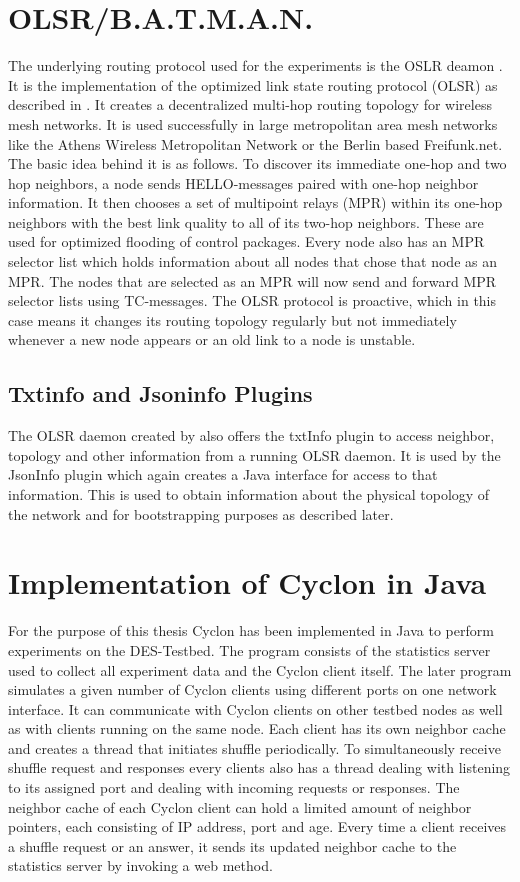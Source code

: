 \section{OLSR/B.A.T.M.A.N.} %
The underlying routing protocol used for the experiments is the OSLR deamon
\cite{Tonnesen2004}.
It is the implementation of the optimized link state routing protocol (OLSR) as
described in \cite{RFC3626}. It creates a decentralized multi-hop routing topology for
wireless mesh networks. It is used successfully in large metropolitan area mesh
networks like the Athens Wireless Metropolitan Network or the Berlin based Freifunk.net.
The basic idea behind it is as follows. To discover its immediate one-hop and
two hop neighbors, a node sends HELLO-messages paired with one-hop neighbor
information. It then chooses a set of multipoint relays (MPR) within its one-hop
neighbors with the best link quality to all of its two-hop neighbors. These are
used for optimized flooding of control packages. Every node also has an MPR
selector list which holds information about all nodes that chose that node
as an MPR. The nodes that are selected as an MPR will now send and forward MPR
selector lists using TC-messages. The OLSR protocol is proactive, which in this
case means it changes its routing topology regularly but not immediately whenever
a new node appears or an old link to a node is unstable.

\subsection{Txtinfo and Jsoninfo Plugins}
The OLSR daemon created by \cite{Tonnesen2004} also offers the txtInfo plugin
\cite{} to access neighbor, topology and other information from a running OLSR
daemon. It is used by the JsonInfo plugin \cite{} which again creates a Java
interface for access to that information. This is used to obtain information
about the physical topology of the network and for bootstrapping purposes as
described later.

\section{Implementation of Cyclon in Java} %
For the purpose of this thesis Cyclon has been implemented in Java to perform
experiments on the DES-Testbed. The program consists of the statistics server
used to collect all experiment data and the Cyclon client itself. The later
program simulates a given number of Cyclon clients using different ports on one
network interface. It can communicate with Cyclon clients on other testbed
nodes as well as with clients running on the same node. Each client has its own
neighbor cache and creates a thread that initiates shuffle periodically. To
simultaneously receive shuffle request and responses every clients also has a
thread dealing with listening to its assigned port and dealing with incoming
requests or responses. The neighbor cache of each Cyclon client can hold a
limited amount of neighbor pointers, each consisting of IP address, port and
age. Every time a client receives a shuffle request or an answer, it sends its
updated neighbor cache to the statistics server by invoking a web method.

